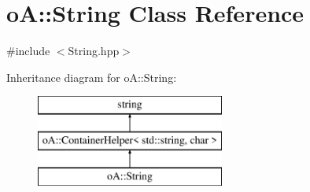 \hypertarget{classo_a_1_1_string}{}\section{oA\+:\+:String Class Reference}
\label{classo_a_1_1_string}


{\ttfamily \#include $<$String.\+hpp$>$}

Inheritance diagram for oA\+:\+:String\+:\begin{figure}[H]
\begin{center}
\leavevmode
\includegraphics[height=3.000000cm]{classo_a_1_1_string}
\end{center}
\end{figure}
